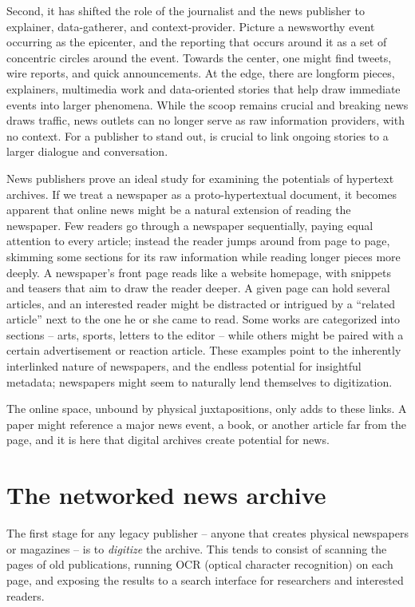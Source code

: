 Second, it has shifted the role of the journalist and the news publisher to explainer, data-gatherer, and context-provider. Picture a newsworthy event occurring as the epicenter, and the reporting that occurs around it as a set of concentric circles around the event. Towards the center, one might find tweets, wire reports, and quick announcements. At the edge, there are longform pieces, explainers, multimedia work and data-oriented stories that help draw immediate events into larger phenomena. While the scoop remains crucial and breaking news draws traffic, news outlets can no longer serve as raw information providers, with no context. For a publisher to stand out, is crucial to link ongoing stories to a larger dialogue and conversation.

News publishers prove an ideal study for examining the potentials of hypertext archives. If we treat a newspaper as a proto-hypertextual document, it becomes apparent that online news might be a natural extension of reading the newspaper. Few readers go through a newspaper sequentially, paying equal attention to every article; instead the reader jumps around from page to page, skimming some sections for its raw information while reading longer pieces more deeply. A newspaper's front page reads like a website homepage, with snippets and teasers that aim to draw the reader deeper. A given page can hold several articles, and an interested reader might be distracted or intrigued by a ``related article'' next to the one he or she came to read. Some works are categorized into sections -- arts, sports, letters to the editor -- while others might be paired with a certain advertisement or reaction article. These examples point to the inherently interlinked nature of newspapers, and the endless potential for insightful metadata; newspapers might seem to naturally lend themselves to digitization.

The online space, unbound by physical juxtapositions, only adds to these links. A paper might reference a major news event, a book, or another article far from the page, and it is here that digital archives create potential for news.

\section{The networked news archive}

The first stage for any legacy publisher -- anyone that creates physical newspapers or magazines -- is to \emph{digitize} the archive. This tends to consist of scanning the pages of old publications, running OCR (optical character recognition) on each page, and exposing the results to a search interface for researchers and interested readers.

